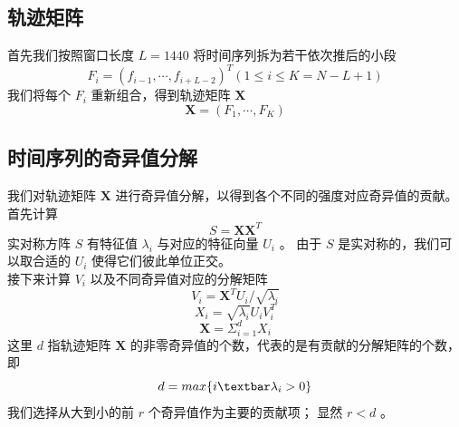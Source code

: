 \documentclass[a4paper]{article}
\begin{document}
\subsection{轨迹矩阵}
首先我们按照窗口长度 $L = 1440$ 将时间序列拆为若干依次推后的小段
\begin{equation}
	\label{eqn:F_i}
	F_i = (f_{i-1}, \cdots, f_{i+L-2})^T  (1 \leq i \leq K = N - L + 1)
\end{equation}
我们将每个 $F_i$ 重新组合，得到轨迹矩阵 $\textbf{X}$
\begin{equation}
	\label{eqn:X}
	\textbf{X} = (F_1, \cdots, F_K)
\end{equation}
\subsection{时间序列的奇异值分解}
我们对轨迹矩阵 $\textbf{X}$ 进行奇异值分解，以得到各个不同的强度对应奇异值的贡献。
首先计算
\begin{equation}
	\label{eqn:S}
	S = \textbf{X} \textbf{X}^T
\end{equation}
实对称方阵 $S$ 有特征值 $\lambda_i$ 与对应的特征向量 $U_i$ 。
由于 $S$ 是实对称的，我们可以取合适的 $U_i$ 使得它们彼此单位正交。
\\
\indent 接下来计算 $V_i$ 以及不同奇异值对应的分解矩阵
\begin{equation}
	\label{eqn:V_i}
	V_i = \textbf{X}^T U_i / \sqrt{\lambda_i}
\end{equation}
\begin{equation}
	\label{eqn:X_i}
	\textbf{$X_i$} = \sqrt{\lambda_i} U_i V_i^T
\end{equation}
\begin{equation}
	\label{eqn:SVD_expanded}
	\textbf{X} = \Sigma_{i=1}^d \textbf{$X_i$}
\end{equation}
这里 $d$ 指轨迹矩阵 $\textbf{X}$ 的非零奇异值的个数，代表的是有贡献的分解矩阵的个数，即
\begin{equation}
	\label{eqn:non-zero-char-d}
	d = max\{i \textbar \lambda_i > 0\}
\end{equation}
我们选择从大到小的前 $r$ 个奇异值作为主要的贡献项；
显然 $r < d$ 。
\end{document}
